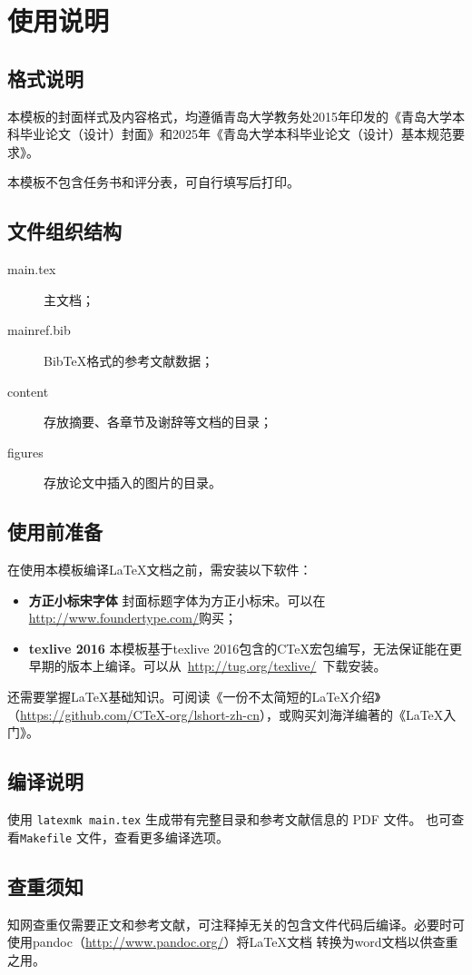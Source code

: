 \chapter{使用说明}
\section{格式说明}
本模板的封面样式及内容格式，均遵循青岛大学教务处2015年印发的《青岛大学本科毕业论文（设计）封面》和2025年《青岛大学本科毕业论文（设计）基本规范要求》。

本模板不包含任务书和评分表，可自行填写后打印。

\section{文件组织结构}
\begin{description}
\item[main.tex] 主文档；
\item[mainref.bib] BibTeX格式的参考文献数据；
\item[content] 存放摘要、各章节及谢辞等文档的目录；
\item[figures] 存放论文中插入的图片的目录。
\end{description}
\section{使用前准备}
在使用本模板编译\LaTeX 文档之前，需安装以下软件：
\begin{itemize}
\item{\bf 方正小标宋字体} 封面标题字体为方正小标宋。可以在\url{http://www.foundertype.com/}购买；
\item{\bf texlive 2016} 本模板基于texlive 2016包含的CTeX宏包编写，无法保证能在更早期的版本上编译。可以从~\url{http://tug.org/texlive/}~下载安装。
\end{itemize}

还需要掌握\LaTeX 基础知识。可阅读《一份不太简短的\LaTeX 介绍》（\url{https://github.com/CTeX-org/lshort-zh-cn}），或购买刘海洋编著的《\LaTeX 入门》。

\section{编译说明}
使用 \texttt{latexmk main.tex} 生成带有完整目录和参考文献信息的 PDF 文件。
也可查看\texttt{Makefile} 文件，查看更多编译选项。

\section{查重须知}
知网查重仅需要正文和参考文献，可注释掉无关的包含文件代码后编译。必要时可使用pandoc（\url{http://www.pandoc.org/}）将\LaTeX 文档 转换为word文档以供查重之用。

